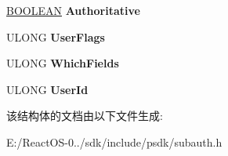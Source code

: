 \begin{DoxyCompactItemize}
\item 
\mbox{\label{struct___m_s_v1__0___v_a_l_i_d_a_t_i_o_n___i_n_f_o_a8221f00e98ff043c83008e7e532ceede}} 
\hyperlink{_processor_bind_8h_a112e3146cb38b6ee95e64d85842e380a}{B\+O\+O\+L\+E\+AN} {\bfseries Authoritative}
\item 
\mbox{\label{struct___m_s_v1__0___v_a_l_i_d_a_t_i_o_n___i_n_f_o_a85119f74feb168199123e01a615fe87b}} 
U\+L\+O\+NG {\bfseries User\+Flags}
\item 
\mbox{\label{struct___m_s_v1__0___v_a_l_i_d_a_t_i_o_n___i_n_f_o_ab7119cd21800020ac442e0d3d841e891}} 
U\+L\+O\+NG {\bfseries Which\+Fields}
\item 
\mbox{\label{struct___m_s_v1__0___v_a_l_i_d_a_t_i_o_n___i_n_f_o_a413582d00384fac3585c252b55fed17d}} 
U\+L\+O\+NG {\bfseries User\+Id}
\end{DoxyCompactItemize}


该结构体的文档由以下文件生成\+:\begin{DoxyCompactItemize}
\item 
E\+:/\+React\+O\+S-\/0../sdk/include/psdk/subauth.\+h\end{DoxyCompactItemize}
